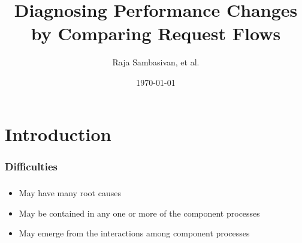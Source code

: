 \documentclass[11pt]{beamer}
\title[eXpress]{Diagnosing Performance Changes by Comparing Request Flows}
\author{Raja Sambasivan, et al.}
\institute{Presented by\\ Mingrui Zhang(1110379057)\\ Hongxu Chen(1110379002)}
\date[\today]{\today}
\begin{document}
\frame{\titlepage}

\part{Introduction}
\frame{\partpage}
\section{Difficulties}
\begin{frame}
\frametitle{\secname}
\begin{itemize}
  \item May have many root causes
  \item May be contained in any one or more of the component processes
  \item May emerge from the interactions among component processes
\end{itemize}
\end{frame}
\end{document}
